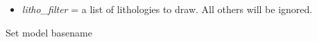 \documentclass[a4paper,10pt,english]{sphinxmanual}
\begin{document}
\begin{fulllineitems}
\begin{fulllineitems}
\begin{description}
\begin{itemize}
\item {} 
\emph{litho\_filter} = a list of lithologies to draw. All others will be ignored.

\end{itemize}

\end{description}

\end{fulllineitems}


\begin{fulllineitems}
\label{pynoddy:pynoddy.output.NoddyOutput.set_basename}
Set model basename

\end{fulllineitems}


\end{fulllineitems}

\end{document}
